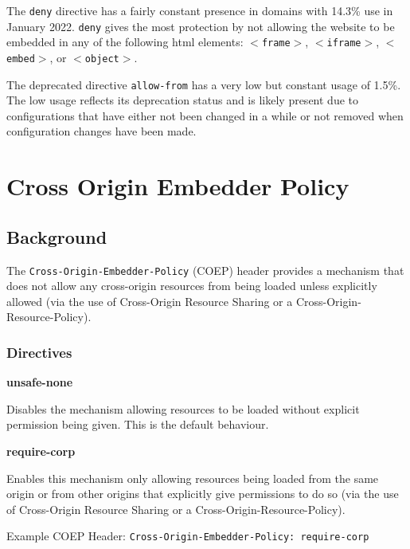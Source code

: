 \documentclass{mscreport}
\begin{document}
\vspace{0.3cm} \noindent
The \texttt{deny} directive has a fairly constant presence in domains with 14.3\% use in January 2022. \texttt{deny} gives the most protection by not allowing the website to be embedded in any of the following html elements: \texttt{$<$frame$>$}, \texttt{$<$iframe$>$}, \texttt{$<$embed$>$}, or \texttt{$<$object$>$}.

\vspace{0.3cm} \noindent
The deprecated directive \texttt{allow-from} has a very low but constant usage of 1.5\%. The low usage reflects its deprecation status and is likely present due to configurations that have either not been changed in a while or not removed when configuration changes have been made.

\clearpage
\newpage


\section{Cross Origin Embedder Policy}
\label{section:coep}

\subsection{Background}

The \texttt{Cross-Origin-Embedder-Policy} (COEP) header provides a mechanism that does not allow any cross-origin resources from being loaded unless explicitly allowed (via the use of Cross-Origin Resource Sharing or a Cross-Origin-Resource-Policy).

\subsubsection{Directives}
\textbf{unsafe-none}

\vspace{0.3cm} \noindent
Disables the mechanism allowing resources to be loaded without explicit permission being given. This is the default behaviour.

\vspace{0.7cm} \noindent
\textbf{require-corp}

\vspace{0.3cm} \noindent
Enables this mechanism only allowing resources being loaded from the same origin or from other origins that explicitly give permissions to do so (via the use of Cross-Origin Resource Sharing or a Cross-Origin-Resource-Policy).

\vspace{0.3cm} \noindent
Example COEP Header: \texttt{Cross-Origin-Embedder-Policy: require-corp}
\end{document}
